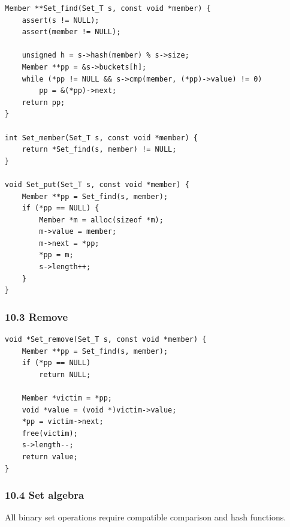 \documentclass[11pt]{article}
\begin{document}
\begin{verbatim}
Member **Set_find(Set_T s, const void *member) {
    assert(s != NULL);
    assert(member != NULL);

    unsigned h = s->hash(member) % s->size;
    Member **pp = &s->buckets[h];
    while (*pp != NULL && s->cmp(member, (*pp)->value) != 0)
        pp = &(*pp)->next;
    return pp;
}

int Set_member(Set_T s, const void *member) {
    return *Set_find(s, member) != NULL;
}

void Set_put(Set_T s, const void *member) {
    Member **pp = Set_find(s, member);
    if (*pp == NULL) {
        Member *m = alloc(sizeof *m);
        m->value = member;
        m->next = *pp;
        *pp = m;
        s->length++;
    }
}
\end{verbatim}

\subsubsection{10.3 Remove}\label{remove}

\begin{verbatim}
void *Set_remove(Set_T s, const void *member) {
    Member **pp = Set_find(s, member);
    if (*pp == NULL)
        return NULL;

    Member *victim = *pp;
    void *value = (void *)victim->value;
    *pp = victim->next;
    free(victim);
    s->length--;
    return value;
}
\end{verbatim}

\subsubsection{10.4 Set algebra}\label{set-algebra}

All binary set operations require compatible comparison and hash functions.
\end{document}
